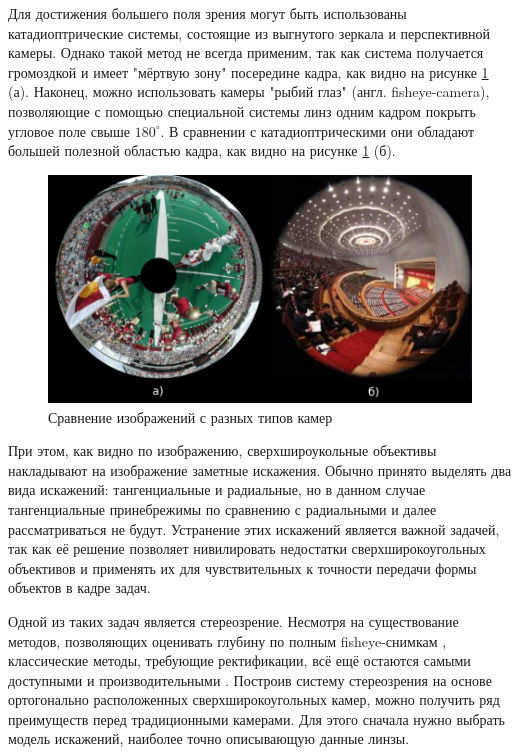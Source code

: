 Для достижения большего поля зрения могут быть использованы катадиоптрические системы, состоящие из выгнутого зеркала и 
перспективной камеры. Однако такой метод не всегда применим, так как система получается громоздкой и имеет "мёртвую зону" посередине 
кадра, как видно на рисунке \ref{pic:wideangle} (а). Наконец, можно использовать камеры "рыбий глаз" (англ. fisheye-camera), 
позволяющие с помощью специальной системы линз одним кадром покрыть угловое поле свыше $180^\circ$. В сравнении с 
катадиоптрическими они обладают большей полезной областью кадра, как видно на рисунке \ref{pic:wideangle} (б). %

\begin{figure}[H]
	\begin{center}
		\includegraphics[scale=0.5]{pics/wideangle.jpg}
		\caption{Сравнение изображений с разных типов камер} 
		\label{pic:wideangle} %
	\end{center}
\end{figure}

При этом, как видно по изображению, сверхшироукольные объективы накладывают на изображение заметные искажения.
Обычно принято выделять два вида искажений: тангенциальные и радиальные, но в данном случае тангенциальные принебрежимы по сравнению
 с радиальными и далее рассматриваться не будут. Устранение этих искажений является важной задачей, так как её решение позволяет 
 нивилировать недостатки сверхширокоугольных объективов и применять их для чувствительных к точности передачи формы объектов в кадре задач.

 Одной из таких задач является стереозрение. Несмотря на существование методов, позволяющих оценивать глубину по полным fisheye-снимкам \cite{singlecamrev}, 
классические методы, требующие ректификации, всё ещё остаются самыми доступными и производительными \cite{disparity_review}. Построив систему стереозрения на 
основе ортогонально расположенных сверхширокоугольных камер, можно получить ряд преимуществ перед традиционными камерами. Для этого 
сначала нужно выбрать модель искажений, наиболее точно описывающую данные линзы. 


